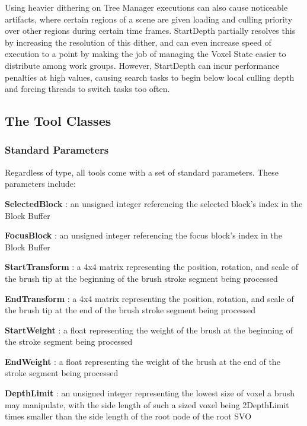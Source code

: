 \documentclass[onecolumn, draftclsnofoot,10pt, compsoc]{IEEEtran}
\begin{document}
Using heavier dithering on Tree Manager executions can also cause noticeable artifacts, where certain regions of a scene are given loading and culling priority over other regions during certain time frames. StartDepth partially resolves this by increasing the resolution of this dither, and can even increase speed of execution to a point by making the job of managing the Voxel State easier to distribute among work groups. However, StartDepth can incur performance penalties at high values, causing search tasks to begin below local culling depth and forcing threads to switch tasks too often.




\subsection{The Tool Classes}

\subsubsection{Standard Parameters}

Regardless of type, all tools come with a set of standard parameters. These parameters include:

\noindent \textbf{SelectedBlock} : an unsigned integer referencing the selected block’s index in the Block Buffer

\noindent \textbf{FocusBlock} : an unsigned integer referencing the focus block’s index in the Block Buffer

\noindent \textbf{StartTransform} : a 4x4 matrix representing the position, rotation, and scale of the brush tip at the beginning of the brush stroke segment being processed

\noindent \textbf{EndTransform} : a 4x4 matrix representing the position, rotation, and scale of the brush tip at the end of the brush stroke segment being processed

\noindent \textbf{StartWeight} : a float representing the weight of the brush at the beginning of the stroke segment being processed

\noindent \textbf{EndWeight} : a float representing the weight of the brush at the end of the stroke segment being processed

\noindent \textbf{DepthLimit} : an unsigned integer representing the lowest size of voxel a brush may manipulate, with the side length of such a sized voxel being 2DepthLimit times smaller than the side length of the root node of the root SVO
\end{document}
